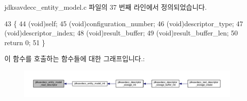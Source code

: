 jdksavdecc\+\_\+entity\+\_\+model.\+c 파일의 37 번째 라인에서 정의되었습니다.


\begin{DoxyCode}
43 \{
44     (void)\textcolor{keyword}{self};
45     (void)configuration\_number;
46     (void)descriptor\_type;
47     (void)descriptor\_index;
48     (void)result\_buffer;
49     (void)result\_buffer\_len;
50     \textcolor{keywordflow}{return} 0;
51 \}
\end{DoxyCode}


이 함수를 호출하는 함수들에 대한 그래프입니다.\+:
\nopagebreak
\begin{figure}[H]
\begin{center}
\leavevmode
\includegraphics[width=350pt]{group__entity_ga1593e02d7c94729d30b20ca383cbe385_icgraph}
\end{center}
\end{figure}


